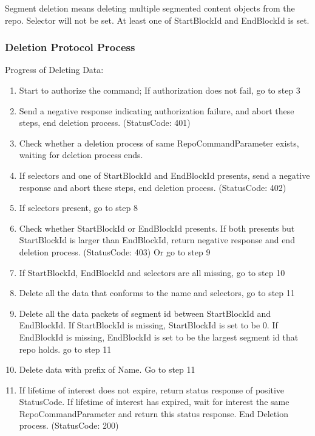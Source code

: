 \documentclass{acm_proc_article-sp}
\begin{document}
Segment deletion means deleting multiple segmented content objects from the repo. Selector will not be set. At least one of StartBlockId and EndBlockId is set.


\subsubsection{Deletion Protocol Process}

Progress of Deleting Data:

\begin{enumerate}[step 1]

\item Start to authorize the command; If authorization does not fail, go to step 3

\item Send a negative response indicating authorization failure, and abort these steps, end deletion process. (StatusCode: 401)

\item Check whether a deletion process of same RepoCommandParameter exists, waiting for deletion process ends.

\item If selectors and one of StartBlockId and EndBlockId presents, send a negative response and abort these steps, end deletion process. (StatusCode: 402)

\item If selectors present, go to step 8

\item Check whether StartBlockId or EndBlockId presents. If both presents but StartBlockId is larger than EndBlockId, return negative response and end deletion process. (StatusCode: 403) Or go to step 9

\item If StartBlockId, EndBlockId and selectors are all missing, go to step 10

\item Delete all the data that conforms to the name and selectors, go to step 11

\item Delete all the data packets of segment id between StartBlockId and EndBlockId. If StartBlockId is missing, StartBlockId is set to be 0. If EndBlockId is missing, EndBlockId is set to be the largest segment id that repo holds. go to step 11

\item Delete data with prefix of Name. Go to step 11

\item If lifetime of interest does not expire, return status response of positive StatusCode. If lifetime of interest has expired, wait for interest the same RepoCommandParameter and return this status response. End Deletion process. (StatusCode: 200)

\end{enumerate}
\end{document}
